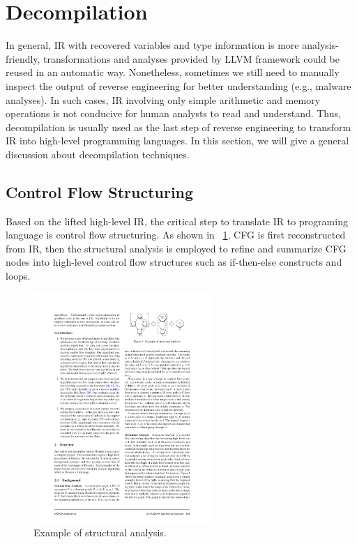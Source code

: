 \section{Decompilation} \label{sec:existing-decompilation}
In general, IR with recovered variables and type information is more analysis-friendly, transformations and analyses provided by LLVM framework could be reused in an automatic way. Nonetheless, sometimes we still need to manually inspect the output of reverse engineering for better understanding (e.g., malware analyses). In such cases, IR involving only simple arithmetic and memory operations is not conducive for human analysts to read and understand. Thus, decompilation is usually used as the last step of reverse engineering to transform IR into high-level programming languages. In this section, we will give a general discussion about decompilation techniques.


\subsection{Control Flow Structuring} \label{sec:existing-structure}
Based on the lifted high-level IR, the critical step to translate IR to programing language is control flow structuring. As shown in \F~\ref{fig:structure}, CFG is first reconstructed from IR, then the structural analysis is employed to refine and summarize CFG nodes into high-level control flow structures such as if-then-else constructs and loops.

\begin{figure}[tb]
  \centering
  \includegraphics[width=0.6\textwidth]{fig/structure.pdf}
  \caption{Example of structural analysis.~\cite{brumley2013native}}
  \label{fig:structure}
\end{figure}

